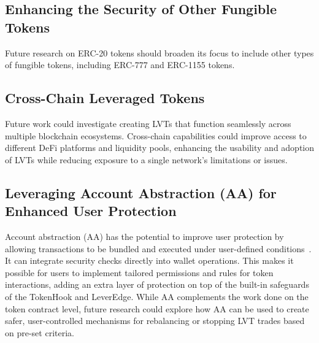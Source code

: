 \subsection{Enhancing the Security of Other Fungible Tokens}
Future research on ERC-20 tokens should broaden its focus to include other types of fungible tokens, including ERC-777 and ERC-1155 tokens.

\subsection{Cross-Chain Leveraged Tokens}
Future work could investigate creating LVTs that function seamlessly across multiple blockchain ecosystems. Cross-chain capabilities could improve access to different DeFi platforms and liquidity pools, enhancing the usability and adoption of LVTs while reducing exposure to a single network's limitations or issues.

\subsection{Leveraging Account Abstraction (AA) for Enhanced User Protection}
Account abstraction (AA) has the potential to improve user protection by allowing transactions to be bundled and executed under user-defined conditions~\cite{Ethereum_AA}. It can integrate security checks directly into wallet operations. This makes it possible for users to implement tailored permissions and rules for token interactions, adding an extra layer of protection on top of the built-in safeguards of the TokenHook and LeverEdge. While AA complements the work done on the token contract level, future research could explore how AA can be used to create safer, user-controlled mechanisms for rebalancing or stopping LVT trades based on pre-set criteria.